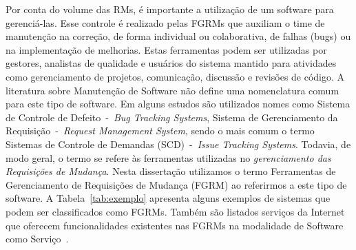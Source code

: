 
Por conta do volume das RMs, é importante a utilização de um software para
gerenciá-las. Esse controle é realizado pelas FGRMs que auxiliam o time de
manutenção na correção, de forma individual ou colaborativa, de falhas (bugs)
ou na implementação de melhorias. Estas ferramentas podem ser utilizadas por
gestores, analistas de qualidade e usuários do sistema mantido para atividades
como gerenciamento de projetos, comunicação, discussão e revisões de código. A
literatura sobre Manutenção de Software não define uma nomenclatura comum para
este tipo de software. Em alguns estudos são utilizados nomes como Sistema de
Controle de Defeito~-~\textit{Bug Tracking Systems}, Sistema de Gerenciamento
da Requisição~-~\textit{Request Management System}, sendo o mais comum o termo
Sistemas de Controle de Demandas (SCD)~-~\textit{Issue Tracking Systems}.
Todavia, de modo geral, o termo se refere às ferramentas utilizadas no
\textit{gerenciamento das Requisições de Mudança}. Nesta dissertação utilizamos
o termo Ferramentas de Gerenciamento de Requisições de Mudança (FGRM) ao
referirmos a este tipo de software. A Tabela~\ref{tab:exemplo} apresenta alguns
exemplos de sistemas que podem ser classificados como FGRMs. Também são
listados serviços da Internet que oferecem funcionalidades existentes nas FGRMs
na modalidade de Software como Serviço~\cite{fox2013engineering}.

\begin{table}[htpb]
\centering
{}
\caption{Exemplos de ferramentas e serviços da Internet que podem ser
    classificados como FGRMs. Extraído de~\cite{cavalcanti2014challenges}}
\label{tab:exemplo}
\end{table}


